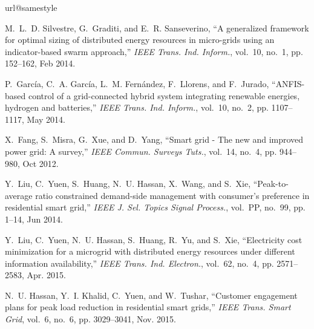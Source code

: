\documentclass[journal,10pt]{IEEEtran}
\begin{document}
\begin{thebibliography}{10}
\providecommand{\url}[1]{#1}
\csname url@samestyle\endcsname
\providecommand{\newblock}{\relax}
\providecommand{\bibinfo}[2]{#2}
\providecommand{\BIBentrySTDinterwordspacing}{\spaceskip=0pt\relax}
\providecommand{\BIBentryALTinterwordstretchfactor}{4}
\providecommand{\BIBentryALTinterwordspacing}{\spaceskip=\fontdimen2\font plus
\BIBentryALTinterwordstretchfactor\fontdimen3\font minus
  \fontdimen4\font\relax}
\providecommand{\BIBforeignlanguage}[2]{{\expandafter\ifx\csname l@#1\endcsname\relax
\typeout{** WARNING: IEEEtran.bst: No hyphenation pattern has been}\typeout{** loaded for the language `#1'. Using the pattern for}\typeout{** the default language instead.}\else
\language=\csname l@#1\endcsname
\fi
#2}}
\providecommand{\BIBdecl}{\relax}
\BIBdecl

M.~L.~D. Silvestre, G.~Graditi, and E.~R. Sanseverino, ``A generalized
  framework for optimal sizing of distributed energy resources in micro-grids
  using an indicator-based swarm approach,'' \emph{IEEE Trans. Ind. Inform.},
  vol.~10, no.~1, pp. 152--162, Feb 2014.

P.~Garc{\'{i}}a, C.~A. Garc{\'{i}}a, L.~M. Fern{\'{a}}ndez, F.~Llorens, and
  F.~Jurado, ``{ANFIS-based control of a grid-connected hybrid system
  integrating renewable energies, hydrogen and batteries},'' \emph{IEEE Trans.
  Ind. Inform.}, vol.~10, no.~2, pp. 1107--1117, May 2014.

X.~Fang, S.~Misra, G.~Xue, and D.~Yang, ``Smart grid - {T}he new and improved
  power grid: {A} survey,'' \emph{IEEE Commun. Surveys Tuts.}, vol.~14, no.~4,
  pp. 944--980, Oct 2012.

Y.~Liu, C.~Yuen, S.~Huang, N.~U. Hassan, X.~Wang, and S.~Xie, ``Peak-to-average
  ratio constrained demand-side management with consumer's preference in
  residential smart grid,'' \emph{IEEE J. Sel. Topics Signal Process.},
  vol.~PP, no.~99, pp. 1--14, Jun 2014.

Y.~Liu, C.~Yuen, N.~U. Hassan, S.~Huang, R.~Yu, and S.~Xie, ``Electricity cost
  minimization for a microgrid with distributed energy resources under
  different information availability,'' \emph{IEEE Trans. Ind. Electron.},
  vol.~62, no.~4, pp. 2571--2583, Apr. 2015.

N.~U. Hassan, Y.~I. Khalid, C.~Yuen, and W.~Tushar, ``Customer engagement plans
  for peak load reduction in residential smart grids,'' \emph{IEEE Trans. Smart
  Grid}, vol.~6, no.~6, pp. 3029--3041, Nov. 2015.


\end{thebibliography}
\end{document}
